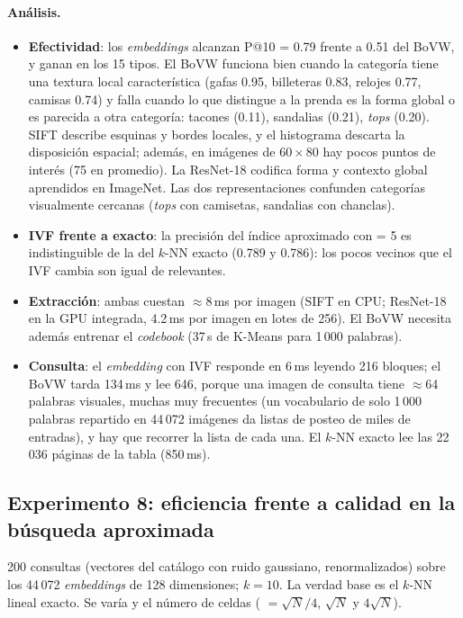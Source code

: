 \paragraph{Análisis.}
\begin{itemize}
\item \textbf{Efectividad}: los \emph{embeddings} alcanzan P@10 = 0.79 frente a 0.51 del BoVW, y
  ganan en los 15 tipos. El BoVW funciona bien cuando la categoría tiene una textura local
  característica (gafas 0.95, billeteras 0.83, relojes 0.77, camisas 0.74) y falla cuando lo que
  distingue a la prenda es la forma global o es parecida a otra categoría: tacones (0.11), sandalias
  (0.21), \emph{tops} (0.20). SIFT describe esquinas y bordes locales, y el histograma descarta la
  disposición espacial; además, en imágenes de $60\times80$ hay pocos puntos de interés (75 en
  promedio). La ResNet-18 codifica forma y contexto global aprendidos en ImageNet. Las dos
  representaciones confunden categorías visualmente cercanas (\emph{tops} con camisetas, sandalias
  con chanclas).
\item \textbf{IVF frente a exacto}: la precisión del índice aproximado con  = 5 es
  indistinguible de la del $k$-NN exacto (0.789 y 0.786): los pocos vecinos que el IVF cambia son
  igual de relevantes.
\item \textbf{Extracción}: ambas cuestan $\approx$8\,ms por imagen (SIFT en CPU; ResNet-18 en la GPU
  integrada, 4.2\,ms por imagen en lotes de 256). El BoVW necesita además entrenar el \emph{codebook}
  (37\,s de K-Means para 1\,000 palabras).
\item \textbf{Consulta}: el \emph{embedding} con IVF responde en 6\,ms leyendo 216 bloques; el BoVW
  tarda 134\,ms y lee 646, porque una imagen de consulta tiene $\approx$64 palabras visuales, muchas
  muy frecuentes (un vocabulario de solo 1\,000 palabras repartido en 44\,072 imágenes da listas de
  posteo de miles de entradas), y hay que recorrer la lista de cada una. El $k$-NN exacto lee las
  22\,036 páginas de la tabla (850\,ms).
\end{itemize}

\subsection{Experimento 8: eficiencia frente a calidad en la búsqueda aproximada}

200 consultas (vectores del catálogo con ruido gaussiano, renormalizados) sobre los 44\,072
\emph{embeddings} de 128 dimensiones; $k=10$. La verdad base es el $k$-NN lineal exacto. Se varía
 y el número de celdas ( $=\sqrt N/4$, $\sqrt N$ y $4\sqrt N$).

